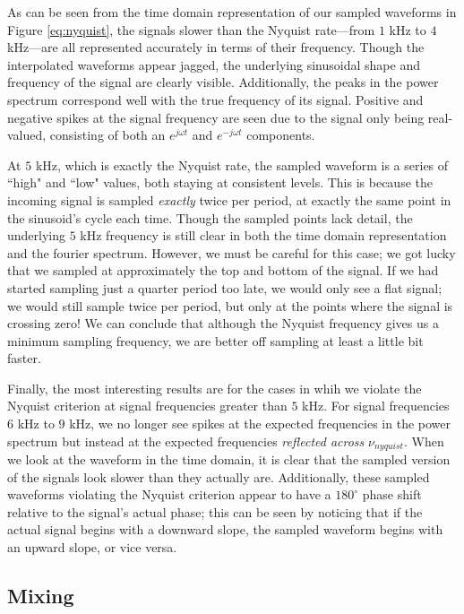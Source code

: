 \documentclass[12pt]{article}
\begin{document}
As can be seen from the time domain representation of our sampled waveforms in Figure \ref{eq:nyquist}, the signals slower than the Nyquist rate---from $1$ kHz to $4$ kHz---are all represented accurately in terms of their frequency. Though the interpolated waveforms appear jagged, the underlying sinusoidal shape and frequency of the signal are clearly visible. Additionally, the peaks in the power spectrum correspond well with the true frequency of its signal. Positive and negative spikes at the signal frequency are seen due to the signal only being real-valued, consisting of both an $e^{j\omega t}$ and $e^{-j\omega t}$ components.

At $5$ kHz, which is exactly the Nyquist rate, the sampled waveform is a series of ``high" and ``low" values, both staying at consistent levels. This is because the incoming signal is sampled \textit{exactly} twice per period, at exactly the same point in the sinusoid's cycle each time. Though the sampled points lack detail, the underlying $5$ kHz frequency is still clear in both the time domain representation and the fourier spectrum. However, we must be careful for this case; we got lucky that we sampled at approximately the top and bottom of the signal. If we had started sampling just a quarter period too late, we would only see a flat signal; we would still sample twice per period, but only at the points where the signal is crossing zero! We can conclude that although the Nyquist frequency gives us a minimum sampling frequency, we are better off sampling at least a little bit faster.

Finally, the most interesting results are for the cases in whih we violate the Nyquist criterion at signal frequencies greater than $5$ kHz. For signal frequencies $6$ kHz to $9$ kHz, we no longer see spikes at the expected frequencies in the power spectrum but instead at the expected frequencies \textit{reflected across} $\nu_{nyquist}$. When we look at the waveform in the time domain, it is clear that the sampled version of the signals look slower than they actually are.  Additionally, these sampled waveforms violating the Nyquist criterion appear to have a $180^\circ$ phase shift relative to the signal's actual phase; this can be seen by noticing that if the actual signal begins with a downward slope, the sampled waveform begins with an upward slope, or vice versa.

\subsection{Mixing} 
\end{document}
